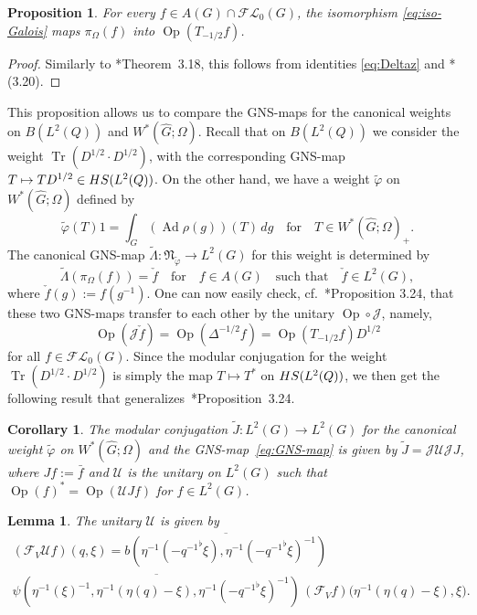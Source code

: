 \documentclass[a4paper,11pt,reqno]{amsart}
\numberwithin{equation}{section}
\newtheorem{corollary}[theorem]{Corollary}
\newtheorem{lemma}[theorem]{Lemma}
\newtheorem{proposition}[theorem]{Proposition}
\theoremstyle{remark}
\theoremstyle{definition}
\newcommand\bp{\begin{proof}}
\newcommand\ep{\end{proof}}
\newcommand\Ad{\operatorname{Ad}}
\newcommand\Tr{\operatorname{Tr}}
\newcommand\Op{\operatorname{Op}}
\newcommand\HS{{\rm HS}}
\newcommand{\CL}{{\mathcal L}{}}
\newcommand{\CJ}{\mathcal J}
\newcommand{\CF}{\mathcal F}
\begin{document}
\begin{proposition}
For every $f\in A(G)\cap\CF\CL_0(G)$, the isomorphism \eqref{eq:iso-Galois} maps $\pi_\Omega(f)$ into $\Op(T_{-1/2}f)$.
\end{proposition}

\bp
Similarly to \cite{BGNT3}*{Theorem~3.18}, this follows from identities \eqref{eq:Deltaz} and \cite{BGNT3}*{(3.20)}.
\ep

This proposition allows us to compare the GNS-maps for the canonical weights on $B(L^2(Q))$ and $W^*(\hat G;\Omega)$. Recall that on $B(L^2(Q))$ we consider the weight $\Tr(D^{1/2}\cdot D^{1/2})$, with the corresponding GNS-map $T\mapsto TD^{1/2}\in \HS(L^2(Q))$. On the other hand, we have a weight $\tilde\varphi$ on $W^*(\hat G;\Omega)$ defined by
$$
\tilde\varphi(T)1=\int_G (\Ad\rho(g))(T)\,dg\quad\text{for}\quad T\in W^*(\hat G;\Omega)_+.
$$
The canonical GNS-map $\tilde\Lambda\colon\mathfrak N_{\tilde\varphi}\to L^2(G)$ for this weight is determined by
\begin{equation}\label{eq:GNS-map}
\tilde\Lambda(\pi_\Omega(f))=\check f\quad\text{for}\quad f\in A(G)\quad\text{such that}\quad\check f\in L^2(G),
\end{equation}
where $\check f(g):=f(g^{-1})$. One can now easily check, cf.~\cite{BGNT3}*{Proposition 3.24}, that these two GNS-maps transfer to each other by the unitary $\Op\circ\CJ$, namely,
$$
\Op(\CJ\check f)=\Op(\Delta^{-1/2}f)=\Op(T_{-1/2}f)D^{1/2}
$$
for all $f\in\CF\CL_0(G)$. Since the modular conjugation for the weight $\Tr(D^{1/2}\cdot D^{1/2})$ is simply the map $T\mapsto T^*$ on $\HS(L^2(Q))$, we then get the following result that generalizes~\cite{BGNT3}*{Proposi\-tion~3.24}.

\begin{corollary}\label{cor:tildeJ}
The modular conjugation $\tilde J\colon L^2(G)\to L^2(G)$ for the canonical weight $\tilde\varphi$ on $W^*(\hat G;\Omega)$ and the GNS-map~\eqref{eq:GNS-map} is given by $\tilde J=\CJ \mathcal U \CJ J$, where $Jf:=\bar f$ and $\mathcal U$ is the unitary on $L^2(G)$ such that $\Op(f)^*=\Op(\mathcal U Jf)$ for $f\in L^2(G)$.
\end{corollary}

\begin{lemma}\label{lem:tildeJ}
The unitary $\mathcal U$ is given by
\begin{multline*}
(\CF_V \mathcal U f)(q,\xi)= \overline {b (\eta^{-1}(-{q^{-1}}^\flat\xi),\eta^{-1}(-{q^{-1}}^\flat\xi)^{-1})} \\
\overline{\psi(\eta^{-1}(\xi)^{-1},\eta^{-1}(\eta(q)-\xi),\eta^{-1}(-{q^{-1}}^\flat\xi)^{-1})} \,
(\CF_V f) \big(\eta^{-1}(\eta(q)-\xi),\xi\big).
\end{multline*}
\end{lemma}
\end{document}
